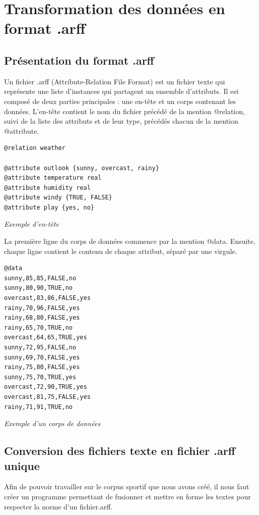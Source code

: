 \documentclass[a4paper,11pt]{article}
\begin{document}
\newpage
\section{Transformation des données en format .arff}
\subsection{Présentation du format .arff}
Un fichier .arff (Attribute-Relation File Format) est un fichier texte qui représente une liste d’instances qui partagent un ensemble d’attributs. Il est composé de deux parties principales : une en-tête et un corps contenant les données.
L’en-tête contient le nom du fichier précédé de la mention @relation, suivi de la liste des attributs et de leur type, précédés chacun de la mention @attribute.\\

\begin{lstlisting}
@relation weather

@attribute outlook {sunny, overcast, rainy}
@attribute temperature real
@attribute humidity real
@attribute windy {TRUE, FALSE}
@attribute play {yes, no}
\end{lstlisting}
\begin{center}
\textit{Exemple d'en-tête}
\end{center}

La première ligne du corps de données commence par la mention @data. Ensuite, chaque ligne contient le contenu de chaque attribut, séparé par une virgule.\\

\begin{lstlisting}
@data
sunny,85,85,FALSE,no
sunny,80,90,TRUE,no
overcast,83,86,FALSE,yes
rainy,70,96,FALSE,yes
rainy,68,80,FALSE,yes
rainy,65,70,TRUE,no
overcast,64,65,TRUE,yes
sunny,72,95,FALSE,no
sunny,69,70,FALSE,yes
rainy,75,80,FALSE,yes
sunny,75,70,TRUE,yes
overcast,72,90,TRUE,yes
overcast,81,75,FALSE,yes
rainy,71,91,TRUE,no
\end{lstlisting}
\begin{center}
\textit{Exemple d’un corps de données}
\end{center}

\subsection{Conversion des fichiers texte en fichier .arff unique}
Afin de pouvoir travailler sur le corpus sportif que nous avons créé, il nous faut créer un programme permettant de fusionner et mettre en forme les textes pour respecter la norme d’un fichier.arff.
\end{document}
